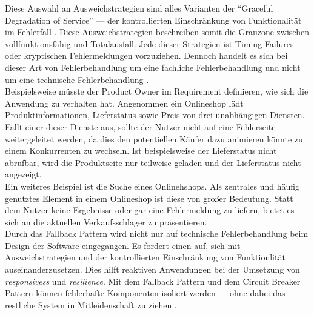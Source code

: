 Diese Auswahl an Ausweichstrategien sind alles Varianten der \enquote{Graceful Degradation of Service} --- der kontrollierten Einschränkung von Funktionalität im Fehlerfall \cite{friedrichsen_unkaputtbar_2014} \cite[S.~207]{newman_building_2015}. Diese Ausweichstrategien beschreiben somit die Grauzone zwischen vollfunktionsfähig und Totalausfall. Jede dieser Strategien ist Timing Failures oder kryptischen Fehlermeldungen vorzuziehen. Dennoch handelt es sich bei dieser Art von Fehlerbehandlung um eine fachliche Fehlerbehandlung und nicht um eine technische Fehlerbehandlung \cite{friedrichsen_unkaputtbar_2014}.\\
Beispielsweise müsste der Product Owner im Requirement definieren, wie sich die Anwendung zu verhalten hat. Angenommen ein Onlineshop lädt Produktinformationen, Lieferstatus sowie Preis von drei unabhängigen Diensten. Fällt einer dieser Dienste aus, sollte der Nutzer nicht auf eine Fehlerseite weitergeleitet werden, da dies den potentiellen Käufer dazu animieren könnte zu einem Konkurrenten zu wechseln. Ist beispielsweise der Lieferstatus nicht abrufbar, wird die Produktseite nur teilweise geladen und der Lieferstatus nicht angezeigt.\\
Ein weiteres Beispiel ist die Suche eines Onlinehshops. Als zentrales und häufig genutztes Element in einem Onlineshop ist diese von großer Bedeutung. Statt dem Nutzer keine Ergebnisse oder gar eine Fehlermeldung zu liefern, bietet es sich an die aktuellen Verkaufsschlager zu präsentieren.\\

Durch das Fallback Pattern wird nicht nur auf technische Fehlerbehandlung beim Design der Software eingegangen. Es fordert einen auf, sich mit Ausweichstrategien und der kontrollierten Einschränkung von Funktionlität auseinanderzusetzen. Dies hilft reaktiven Anwendungen bei der Umsetzung von \textit{responsivess} und \textit{resilience}. Mit dem Fallback Pattern und dem Circuit Breaker Pattern können fehlerhafte Komponenten isoliert werden --- ohne dabei das restliche System in Mitleidenschaft zu ziehen \cite[S.~71]{hanmer_patterns_2007}.

\pagebreak

